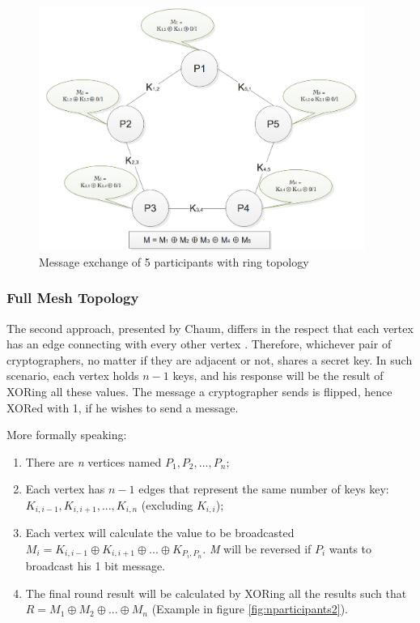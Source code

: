 \begin{figure}[h!]
    \centering
    \includegraphics[width=0.95\textwidth]{Images/nparticipants1.png}
    \caption{Message exchange of 5 participants with ring topology}
    \label{fig:nparticipants1}
\end{figure}


\subsubsection{Full Mesh Topology} \label{sec:fullmeshtopology}
The second approach, presented by Chaum, differs in the respect that each vertex has an edge connecting with every other vertex \cite{Chaum}. Therefore, whichever pair of cryptographers, no matter if they are adjacent or not, shares a secret key. In such scenario, each vertex holds \textit{$n - 1$} keys, and his response will be the result of XORing all these values. The message a cryptographer sends is flipped, hence XORed with 1, if he  wishes to send a message.

More formally speaking:
\begin{enumerate}
    \item There are \textit{n} vertices named \textit{$P_1, P_2, ..., P_n$};
    \item Each vertex has \textit{$n-1$} edges that represent the same number of keys key: \textit{$K_{i,i-1}, K_{i,i+1}, ... , K_{i,n} $} (excluding \textit{$K_{i,i}$});
    \item Each vertex will calculate the value to be broadcasted \textit{$M_i = K_{i,i-1} \oplus K_{i,i+1} \oplus ... \oplus K_{P_i,P_n} $}. \textit{M} will be reversed if \textit{$P_i$} wants to broadcast his 1 bit message.
    \item The final round result will be calculated by XORing all the results such that \textit{$R = M_1 \oplus M_2 \oplus ... \oplus M_n$} (Example in figure \ref{fig:nparticipants2}). \newline
\end{enumerate}



